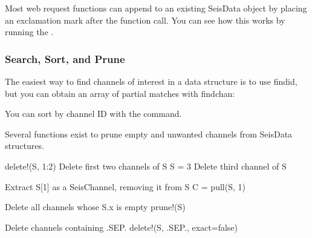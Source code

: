 \documentclass[letterpaper,11pt,english]{sphinxmanual}
\begin{document}
Most web request functions can append to an existing SeisData object by placing
an exclamation mark after the function call. You can see how this works by
running the .


\subsubsection{Search, Sort, and Prune}
\label{\detokenize{src/working_with_data:search-sort-and-prune}}
The easiest way to find channels of interest in a data structure is to
use findid, but you can obtain an array of partial matches with findchan:

\begin{sphinxVerbatim}[commandchars=\\\{\}]
   
       
      \PYG{p}{[}    \PYG{p}{]} 
     
           
\end{sphinxVerbatim}

You can sort by channel ID with the  command.

Several functions exist to prune empty and unwanted channels from SeisData
structures.

\begin{sphinxVerbatim}[commandchars=\\\{\}]
delete!(S, 1:2)  \PYGZsh{} Delete first two channels of S
S \PYGZhy{}= 3           \PYGZsh{} Delete third channel of S

\PYGZsh{} Extract S[1] as a SeisChannel, removing it from S
C = pull(S, 1)

\PYGZsh{} Delete all channels whose S.x is empty
prune!(S)

\PYGZsh{} Delete channels containing \PYGZdq{}.SEP.\PYGZdq{}
delete!(S, \PYGZdq{}.SEP.\PYGZdq{}, exact=false)
\end{sphinxVerbatim}
\end{document}
